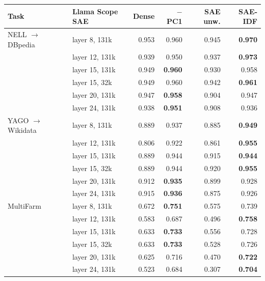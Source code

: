 \begin{tabular}{@{}llrrrr@{}}
\toprule
Task & Llama Scope SAE & Dense & $-$PC1 & SAE unw. & \textbf{SAE-IDF} \\
\midrule
NELL $\to$ DBpedia & layer 8, 131k & 0.953 & 0.960 & 0.945 & \textbf{0.970} \\
 & layer 12, 131k & 0.939 & 0.950 & 0.937 & \textbf{0.973} \\
 & layer 15, 131k & 0.949 & \textbf{0.960} & 0.930 & 0.958 \\
 & layer 15, 32k & 0.949 & 0.960 & 0.942 & \textbf{0.961} \\
 & layer 20, 131k & 0.947 & \textbf{0.958} & 0.904 & 0.947 \\
 & layer 24, 131k & 0.938 & \textbf{0.951} & 0.908 & 0.936 \\
YAGO $\to$ Wikidata & layer 8, 131k & 0.889 & 0.937 & 0.885 & \textbf{0.949} \\
 & layer 12, 131k & 0.806 & 0.922 & 0.861 & \textbf{0.955} \\
 & layer 15, 131k & 0.889 & 0.944 & 0.915 & \textbf{0.944} \\
 & layer 15, 32k & 0.889 & 0.944 & 0.920 & \textbf{0.955} \\
 & layer 20, 131k & 0.912 & \textbf{0.935} & 0.899 & 0.928 \\
 & layer 24, 131k & 0.915 & \textbf{0.936} & 0.875 & 0.926 \\
MultiFarm & layer 8, 131k & 0.672 & \textbf{0.751} & 0.575 & 0.739 \\
 & layer 12, 131k & 0.583 & 0.687 & 0.496 & \textbf{0.758} \\
 & layer 15, 131k & 0.633 & \textbf{0.733} & 0.556 & 0.728 \\
 & layer 15, 32k & 0.633 & \textbf{0.733} & 0.528 & 0.726 \\
 & layer 20, 131k & 0.625 & 0.716 & 0.470 & \textbf{0.722} \\
 & layer 24, 131k & 0.523 & 0.684 & 0.307 & \textbf{0.704} \\
\bottomrule
\end{tabular}
